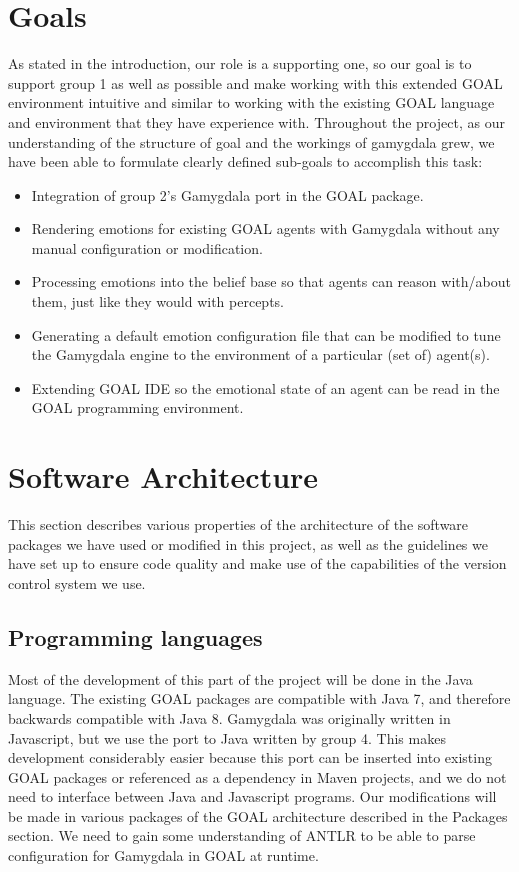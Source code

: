 \documentclass[]{article}
\begin{document}
\section{Goals}
As stated in the introduction, our role is a supporting one, so our goal is to support group 1 as well as possible and make working with this extended GOAL environment intuitive and similar to working with the existing GOAL language and environment that they have experience with.
Throughout the project, as our understanding of the structure of goal and the workings of gamygdala grew, we have been able to formulate clearly defined sub-goals to accomplish this task:
\begin{itemize}
  \item Integration of group 2's Gamygdala port in the GOAL package.
  \item Rendering emotions for existing GOAL agents with Gamygdala without any manual configuration or modification.
  \item Processing emotions into the belief base so that agents can reason with/about them, just like they would with percepts.
  \item Generating a default emotion configuration file that can be modified to tune the Gamygdala engine to the environment of a particular (set of) agent(s).
  \item Extending GOAL IDE so the emotional state of an agent can be read in the GOAL programming environment.
\end{itemize}

\section{Software Architecture}
This section describes various properties of the architecture of the software packages we have used or modified in this project, as well as the guidelines we have set up to ensure code quality and make use of the capabilities of the version control system we use.
\subsection{Programming languages}
Most of the development of this part of the project will be done in the Java language. The existing GOAL packages are compatible with Java 7, and therefore backwards compatible with Java 8. Gamygdala was originally written in Javascript, but we use the port to Java written by group 4. This makes development considerably easier because this port can be inserted into existing GOAL packages or referenced as a dependency in Maven projects, and we do not need to interface between Java and Javascript programs. Our modifications will be made in various packages of the GOAL architecture described in the Packages section. We need to gain some understanding of \gls{ANTLR} to be able to parse configuration for Gamygdala in GOAL at runtime. 
\end{document}
